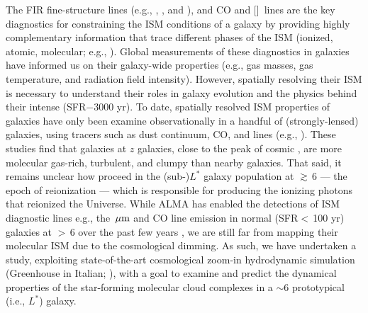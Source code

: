 \IfFileExists{emulateapjlegacy.cls}{\documentclass[iop]{emulateapjlegacy}}{\documentclass[iop]{emulateapj}}
\begin{document}
The FIR fine-structure lines (e.g., \cii, \nii, and \oiii), and CO and [\ci]~lines are the key diagnostics for
constraining the ISM conditions of a galaxy by
providing highly complementary information that trace different phases of the ISM (ionized,
atomic, molecular; e.g., \citealt{Scoville74a, Rubin85a, Malhotra01a}).
Global measurements of these diagnostics in \highz galaxies
have informed us on their galaxy-wide properties (e.g.,
gas masses, gas temperature, and radiation field intensity).
However, spatially resolving their ISM is necessary to understand their roles in galaxy evolution and
the physics behind their intense \SF (SFR$-$3000\,\Msun\,yr\pmOne).
To date, spatially resolved ISM properties of \highz galaxies
have only been examine observationally in a handful of (strongly-lensed)
galaxies, using tracers such as
dust continuum, CO, and \cii lines (e.g., \citealt{Swinbank11a, Hodge15a, Ferkinhoff15a, Hodge16a, Leung19a}).
These studies find that galaxies at $z$ galaxies, close to the peak of cosmic \SF, are more
molecular gas-rich, turbulent, and clumpy than nearby galaxies.
That said, it remains unclear how \SF proceed in the (sub-)$L^*$ galaxy population at \z$\gtrsim$\,6 ---
the epoch of reionization  ---
which is responsible for producing the
ionizing photons that reionized the Universe.
While ALMA has enabled the detections of
ISM diagnostic lines e.g., the \,$\mbox{$\mu$m}$ and CO line emission in
normal (SFR$<$\,100\,\Msun\,yr\pmOne) galaxies at \z$>$\,6 over the past few years \citep[e.g.,][]{Odorico18a, Carniani18b},
we are still far from mapping their molecular ISM due to the cosmological dimming.
As such, we have undertaken a study, exploiting
state-of-the-art cosmological zoom-in hydrodynamic simulation
 (Greenhouse in Italian; \citealt{Pallottini17a, Pallottini17b}), with a goal to examine
and predict the dynamical properties of the star-forming molecular cloud complexes in a \z$\sim$6 prototypical (i.e., $L^*$)
galaxy. %
\end{document}
